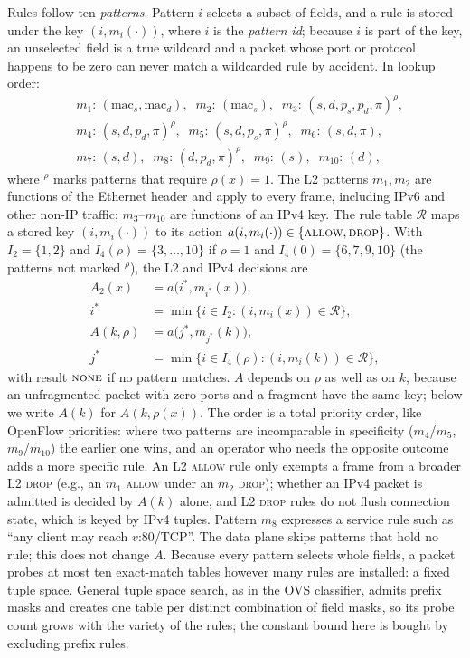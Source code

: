 \documentclass[conference]{IEEEtran}
\begin{document}
Rules follow ten \emph{patterns}. Pattern $i$ selects a subset of fields, and a
rule is stored under the key $(i, m_i(\cdot))$, where $i$ is the
\emph{pattern id}; because $i$ is part of the key, an unselected field is a
true wildcard and a packet whose port or protocol happens to be zero can never
match a wildcarded rule by accident. In lookup order:
\begin{equation}
\begin{aligned}
&m_1{:}\,(\mathrm{mac}_s,\mathrm{mac}_d),\;\; m_2{:}\,(\mathrm{mac}_s),\;\;
 m_3{:}\,(s,d,p_s,p_d,\pi)^{\rho},\\
&m_4{:}\,(s,d,p_d,\pi)^{\rho},\;\; m_5{:}\,(s,d,p_s,\pi)^{\rho},\;\;
 m_6{:}\,(s,d,\pi),\\
&m_7{:}\,(s,d),\;\; m_8{:}\,(d,p_d,\pi)^{\rho},\;\; m_9{:}\,(s),\;\;
 m_{10}{:}\,(d),
\end{aligned}
\label{eq:patterns}
\end{equation}
where $^{\rho}$ marks patterns that require $\rho(x)=1$. The L2 patterns
$m_1,m_2$ are functions of the Ethernet header and apply to every frame,
including IPv6 and other non-IP traffic; $m_3$--$m_{10}$ are functions of an
IPv4 key. The rule table $\mathcal{R}$ maps a stored key $(i,m_i(\cdot))$ to
its action $a(i,m_i(\cdot)) \in \{\textsc{allow},\textsc{drop}\}$. With
$I_2=\{1,2\}$ and $I_4(\rho)=\{3,\dots,10\}$ if $\rho=1$ and
$I_4(0)=\{6,7,9,10\}$ (the patterns not marked $^{\rho}$), the L2 and IPv4
decisions are
\begin{equation}
\begin{aligned}
A_2(x) &= a\big(i^*, m_{i^*}(x)\big),\\
i^* &= \min\{i \in I_2 : (i, m_i(x)) \in \mathcal{R}\},\\
A(k,\rho) &= a\big(j^*, m_{j^*}(k)\big),\\
j^* &= \min\{i \in I_4(\rho) : (i, m_i(k)) \in \mathcal{R}\},
\end{aligned}
\label{eq:match}
\end{equation}
with result $\textsc{none}$ if no pattern matches. $A$ depends on $\rho$
as well as on $k$, because an unfragmented packet with zero ports and a
fragment have the same key; below we write $A(k)$ for $A(k,\rho(x))$. The order is a total
priority order, like OpenFlow priorities: where two patterns are incomparable
in specificity ($m_4$/$m_5$, $m_9$/$m_{10}$) the earlier one wins, and an
operator who needs the opposite outcome adds a more specific rule. An L2
\textsc{allow} rule only exempts a frame from a broader L2 \textsc{drop}
(e.g., an $m_1$ \textsc{allow} under an $m_2$ \textsc{drop}); whether an IPv4
packet is admitted is decided by $A(k)$ alone, and L2 \textsc{drop} rules
do not flush connection state, which is keyed by IPv4 tuples. Pattern $m_8$ expresses a
service rule such as ``any client may reach $v$:80/TCP''. The data plane skips
patterns that hold no rule; this does not change $A$. Because every pattern
selects whole fields, a packet probes at most ten exact-match tables however
many rules are installed: a fixed tuple space. General tuple space search, as
in the OVS classifier, admits prefix masks and creates one table per distinct
combination of field masks, so its probe count grows with the variety of the
rules; the constant bound here is bought by excluding prefix rules.
\end{document}
